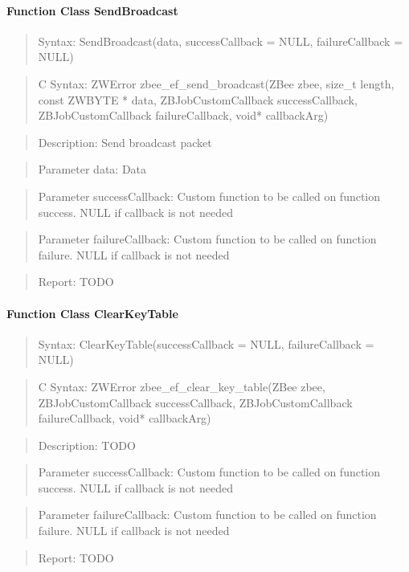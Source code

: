 \paragraph{Function Class SendBroadcast}
\begin{quote}Syntax: SendBroadcast(data, successCallback = NULL, failureCallback = NULL)\end{quote}
\begin{quote}C Syntax: ZWError zbee\_ef\_send\_broadcast(ZBee zbee, size\_t length, const ZWBYTE * data, ZBJobCustomCallback successCallback, ZBJobCustomCallback failureCallback, void* callbackArg)\end{quote}
\begin{quote}Description: Send broadcast packet\end{quote}
\begin{quote}Parameter data: Data\end{quote}
\begin{quote}Parameter successCallback: Custom function to be called on function success. NULL if callback is not needed\end{quote}
\begin{quote}Parameter failureCallback: Custom function to be called on function failure. NULL if callback is not needed\end{quote}
\begin{quote}Report: TODO\end{quote}

\paragraph{Function Class ClearKeyTable}
\begin{quote}Syntax: ClearKeyTable(successCallback = NULL, failureCallback = NULL)\end{quote}
\begin{quote}C Syntax: ZWError zbee\_ef\_clear\_key\_table(ZBee zbee, ZBJobCustomCallback successCallback, ZBJobCustomCallback failureCallback, void* callbackArg)\end{quote}
\begin{quote}Description: TODO\end{quote}
\begin{quote}Parameter successCallback: Custom function to be called on function success. NULL if callback is not needed\end{quote}
\begin{quote}Parameter failureCallback: Custom function to be called on function failure. NULL if callback is not needed\end{quote}
\begin{quote}Report: TODO\end{quote}

